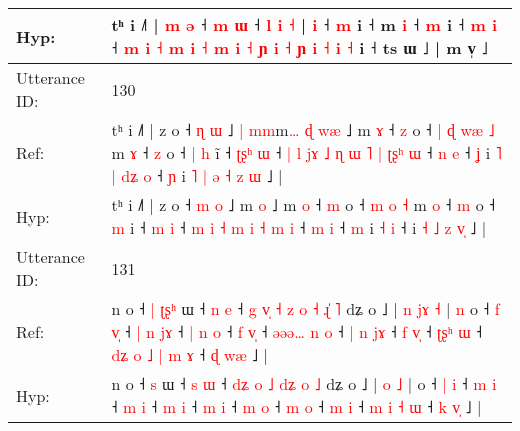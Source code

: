 \documentclass[10pt]{article}
\DeclareRobustCommand{\hl}[1]{{\textcolor{red}{#1}}}
\begin{document}
\begin{longtable}{ll}
 \\
Hyp: & tʰ i ˩˥ | \hl{m} \hl{ə} ˧\hl{}\hl{} \hl{m} \hl{ɯ} ˧ \hl{l} \hl{i} \hl{˧} |\hl{}\hl{} \hl{}\hl{i} ˧\hl{}\hl{} \hl{m} i ˧ m \hl{i} ˧ \hl{m} i ˧ \hl{m} \hl{i} ˧ \hl{m} \hl{i} \hl{}\hl{˧} \hl{m} \hl{i} \hl{˧} \hl{m} \hl{i} \hl{˧} \hl{ɲ} \hl{}\hl{i} \hl{˧} \hl{ɲ} \hl{}\hl{i} \hl{}\hl{˧} \hl{i} \hl{˧} i ˧ ts ɯ ˩ | m v̩ ˩
 \\
\midrule
Utterance ID: & 130 \\
Ref: & tʰ i ˩˥ | z o ˧ \hl{ɳ} \hl{ɯ} ˩\hl{ }\hl{|} \hl{m}\hl{m}m\hl{…}\hl{ }\hl{ɖ} \hl{w}\hl{æ} ˩ m \hl{ɤ} ˧ \hl{z} o ˧\hl{ }\hl{|} \hl{ɖ} \hl{w}\hl{æ} \hl{˩} m \hl{ɤ} ˧ \hl{z} o ˧\hl{ }\hl{|} \hl{h} i\hl{̃} ˧ \hl{ʈ}\hl{ʂ}\hl{ʰ} \hl{ɯ} ˧\hl{ }\hl{|}\hl{ }\hl{l} \hl{j}\hl{ɤ} \hl{˩} \hl{ɳ} \hl{ɯ} \hl{˥} \hl{|} \hl{ʈ}\hl{ʂ}\hl{ʰ} \hl{ɯ} ˧ \hl{n} \hl{e} ˧ \hl{ʝ} i\hl{ }\hl{˥}\hl{ }\hl{|} \hl{d}\hl{ʑ} \hl{o} ˧\hl{ }\hl{ɲ} i\hl{ }\hl{˥} \hl{|} \hl{ə} \hl{˧} \hl{z}\hl{ }\hl{ɯ} ˩ |
 \\
Hyp: & tʰ i ˩˥ | z o ˧ \hl{m} \hl{o} ˩\hl{}\hl{} \hl{}\hl{}m\hl{}\hl{}\hl{} \hl{}\hl{o} ˩ m \hl{o} ˧ \hl{m} o ˧\hl{}\hl{} \hl{m} \hl{}\hl{o} \hl{˧} m \hl{o} ˧ \hl{m} o ˧\hl{}\hl{} \hl{m} i\hl{} ˧ \hl{}\hl{}\hl{m} \hl{i} ˧\hl{}\hl{}\hl{}\hl{} \hl{}\hl{m} \hl{i} \hl{˧} \hl{m} \hl{i} \hl{˧} \hl{}\hl{}\hl{m} \hl{i} ˧ \hl{m} \hl{i} ˧ \hl{m} i\hl{}\hl{}\hl{}\hl{} \hl{}\hl{˧} \hl{i} ˧\hl{}\hl{} i\hl{}\hl{} \hl{˧} \hl{˩} \hl{z} \hl{}\hl{v}\hl{̩} ˩ |
 \\
\midrule
Utterance ID: & 131 \\
Ref: & n o ˧\hl{ }\hl{|} \hl{ʈ}\hl{ʂ}\hl{ʰ} ɯ ˧ \hl{n} \hl{e} ˧\hl{ }\hl{g} \hl{v}\hl{̩} \hl{˧} \hl{z} \hl{o}\hl{ }\hl{˧} \hl{ɻ}\hl{̍} \hl{˥} dʑ o ˩ |\hl{ }\hl{n} \hl{j}\hl{ɤ} \hl{˧} |\hl{ }\hl{n} o ˧ \hl{f} \hl{v}\hl{̩} ˧\hl{ }\hl{|} \hl{n} \hl{j}\hl{ɤ} ˧\hl{ }\hl{|} \hl{n} \hl{o} ˧ \hl{f} \hl{v}\hl{̩} ˧\hl{ }\hl{ə}\hl{ə}\hl{ə}\hl{…} \hl{n} \hl{o} ˧\hl{ }\hl{|} \hl{n} \hl{j}\hl{ɤ} ˧ \hl{f} \hl{v}\hl{̩} ˧ \hl{ʈ}\hl{ʂ}\hl{ʰ} \hl{ɯ} ˧\hl{ }\hl{d}\hl{ʑ}\hl{ }\hl{o} \hl{˩} \hl{|} \hl{m} \hl{ɤ} ˧ \hl{ɖ} \hl{w}\hl{æ} ˩ |
 \\
Hyp: & n o ˧\hl{}\hl{} \hl{}\hl{}\hl{s} ɯ ˧ \hl{s} \hl{ɯ} ˧\hl{}\hl{} \hl{d}\hl{ʑ} \hl{o} \hl{˩} \hl{}\hl{d}\hl{ʑ} \hl{}\hl{o} \hl{˩} dʑ o ˩ |\hl{}\hl{} \hl{}\hl{o} \hl{˩} |\hl{}\hl{} o ˧ \hl{|} \hl{}\hl{i} ˧\hl{}\hl{} \hl{m} \hl{}\hl{i} ˧\hl{}\hl{} \hl{m} \hl{i} ˧ \hl{m} \hl{}\hl{i} ˧\hl{}\hl{}\hl{}\hl{}\hl{} \hl{m} \hl{i} ˧\hl{}\hl{} \hl{m} \hl{}\hl{o} ˧ \hl{m} \hl{}\hl{o} ˧ \hl{}\hl{}\hl{m} \hl{i} ˧\hl{}\hl{}\hl{}\hl{}\hl{} \hl{m} \hl{i} \hl{˧} \hl{ɯ} ˧ \hl{k} \hl{v}\hl{̩} ˩ |

\end{longtable}
\end{document}

